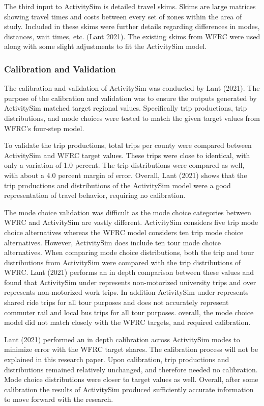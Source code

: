 \documentclass[12pt, oneside, openright]{byuthesis}
\begin{document}
The third input to ActivitySim is detailed travel skims. Skims are large matrices showing travel times and costs between every set of zones within the area of study. Included in these skims were further details regarding differences in modes, distances, wait times, etc. (Lant 2021). The existing skims from WFRC were used along with some slight adjustments to fit the ActivitySim model.

\hypertarget{asimcal}{%
\subsubsection{Calibration and Validation}\label{asimcal}}

The calibration and validation of ActivitySim was conducted by Lant (2021). The purpose of the calibration and validation was to ensure the outputs generated by ActivitySim matched target regional values. Specifically trip productions, trip distributions, and mode choices were tested to match the given target values from WFRC's four-step model.

To validate the trip productions, total trips per county were compared between ActivitySim and WFRC target values. These trips were close to identical, with only a variation of 1.0 percent. The trip distributions were compared as well, with about a 4.0 percent margin of error. Overall, Lant (2021) shows that the trip productions and distributions of the ActivitySim model were a good representation of travel behavior, requiring no calibration.

The mode choice validation was difficult as the mode choice categories between WFRC and ActivitySim are vastly different. ActivitySim considers five trip mode choice alternatives whereas the WFRC model considers ten trip mode choice alternatives. However, ActivitySim does include ten tour mode choice alternatives. When comparing mode choice distributions, both the trip and tour distributions from ActivitySim were compared with the trip distributions of WFRC. Lant (2021) performs an in depth comparison between these values and found that ActivitySim under represents non-motorized university trips and over represents non-motorized work trips. In addition ActivitySim under represents shared ride trips for all tour purposes and does not accurately represent commuter rail and local bus trips for all tour purposes. overall, the mode choice model did not match closely with the WFRC targets, and required calibration.

Lant (2021) performed an in depth calibration across ActivitySim modes to minimize error with the WFRC target shares. The calibration process will not be explained in this research paper. Upon calibration, trip productions and distributions remained relatively unchanged, and therefore needed no calibration. Mode choice distributions were closer to target values as well. Overall, after some calibration the results of ActivitySim produced sufficiently accurate information to move forward with the research.
\end{document}
